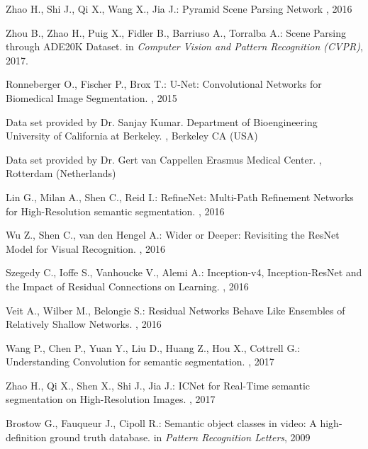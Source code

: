 \documentclass{article}
\begin{document}
\begin{thebibliography}{1}
Zhao H., Shi J., Qi X., Wang X., Jia J.:
\newblock Pyramid Scene Parsing Network
, 2016


Zhou B., Zhao H., Puig X., Fidler B., Barriuso A., Torralba A.: 
\newblock Scene Parsing through ADE20K Dataset.
\newblock in {\em Computer Vision and Pattern Recognition (CVPR)}, 2017. 


Ronneberger O., Fischer P., Brox T.: 
\newblock U-Net: Convolutional Networks for Biomedical Image Segmentation.
, 2015


Data set provided by Dr. Sanjay Kumar. Department of Bioengineering University of California at Berkeley.
, 
Berkeley CA (USA)


Data set provided by Dr. Gert van Cappellen Erasmus Medical Center. 
,
Rotterdam (Netherlands)


Lin G., Milan A., Shen C., Reid I.:
\newblock RefineNet: Multi-Path Refinement Networks for High-Resolution semantic segmentation.
, 2016

Wu Z., Shen C., van den Hengel A.:
\newblock Wider or Deeper: Revisiting the ResNet Model for Visual Recognition.
, 2016

Szegedy C., Ioffe S., Vanhoucke V., Alemi A.:
\newblock Inception-v4, Inception-ResNet and the Impact of Residual Connections on Learning.
, 2016

Veit A., Wilber M., Belongie S.:
\newblock Residual Networks Behave Like Ensembles of Relatively Shallow Networks.
, 2016

Wang P., Chen P., Yuan Y., Liu D., Huang Z., Hou X., Cottrell G.:
\newblock Understanding Convolution for semantic segmentation.
, 2017

Zhao H., Qi X., Shen X., Shi J., Jia J.:
\newblock ICNet for Real-Time semantic segmentation on High-Resolution Images.
, 2017

Brostow G., Fauqueur J., Cipoll R.:
\newblock Semantic object classes in video: A high-definition ground truth database.
\newblock in {\em Pattern Recognition Letters}, 2009


\end{thebibliography}
\end{document}
